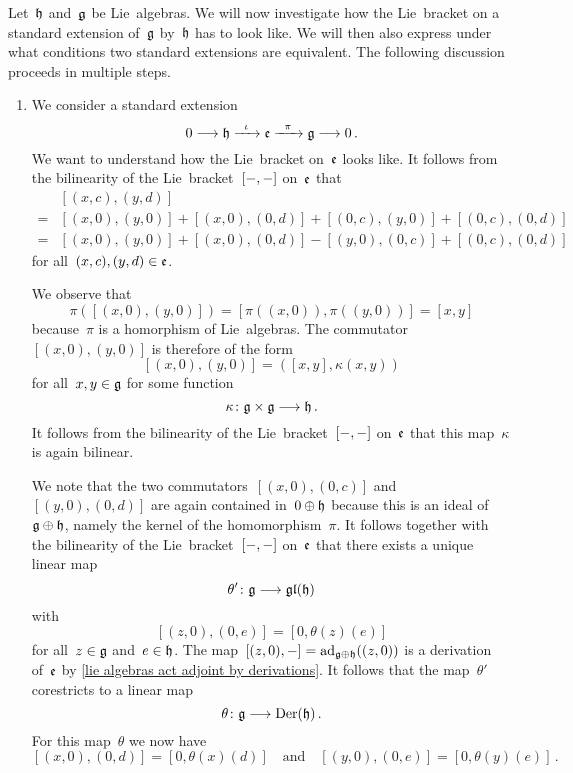 \begin{fluff}
	\label{general approach to extensions}
	Let~$\mathfrak{h}$ and~$\mathfrak{g}$ be Lie~algebras.
	We will now investigate how the Lie~bracket on a standard extension of~$\mathfrak{g}$ by~$\mathfrak{h}$ has to look like.
	We will then also express under what conditions two standard extensions are equivalent.
	The following discussion proceeds in multiple steps.
	\begin{enumerate}
		\item
			We consider a standard extension
			\[
				0
				\to
				\hlie
				\xto{\iota}
				\elie
				\xto{\pi}
				\glie
				\to
				0 \,.
			\]
			We want to understand how the Lie~bracket on~$\mathfrak{e}$ looks like.
			It follows from the bilinearity of the Lie~bracket~$[-, -]$ on~$\mathfrak{e}$ that
			\begin{align*}
				{}&
				[(x, c), (y,d)]
				\\
				={}&
					[(x,0), (y,0)]
				+ [(x,0), (0,d)]
				+ [(0,c), (y,0)]
				+ [(0,c), (0,d)]
				\\
				={}&
					[(x,0), (y,0)]
				+ [(x,0), (0,d)]
				- [(y,0), (0,c)]
				+ [(0,c), (0,d)]
			\end{align*}
			for all~$(x,c), (y,d) \in \mathfrak{e}$.

			We observe that
			\[
				\pi( [(x,0), (y,0)] )
				=
				[ \pi( (x,0) ), \pi( (y,0) ) ]
				=
				[x, y]
			\]
			because~$\pi$ is a homorphism of Lie~algebras.
			The commutator~$[(x,0), (y,0)]$ is therefore of the form
			\[
				[(x,0), (y,0)]
				=
				( [x,y], \kappa(x,y) )
			\]
			for all~$x, y \in \mathfrak{g}$ for some function
			\[
				\kappa
				\colon
				\glie \times \glie
				\to
				\hlie \,.
			\]
			It follows from the bilinearity of the Lie~bracket~$[-, -]$ on~$\mathfrak{e}$ that this map~$\kappa$ is again bilinear.

			We note that the two commutators~$[(x,0), (0,c)]$ and~$[(y,0), (0,d)]$ are again contained in~$0 \oplus \mathfrak{h}$ because this is an ideal of~$\mathfrak{g} \oplus \mathfrak{h}$, namely the kernel of the homomorphism~$\pi$.
			It follows together with the bilinearity of the Lie~bracket~$[-, -]$ on~$\mathfrak{e}$ that there exists a unique linear map
			\[
				\theta'
				\colon
				\glie
				\to
				\gllie(\hlie)
			\]
			with
			\[
				[(z,0), (0,e)]
				=
				[0, \theta(z)(e)]
			\]
			for all~$z \in \mathfrak{g}$ and~$e \in \mathfrak{h}$.
			The map~$[(z,0), -] = \operatorname{ad}_{\mathfrak{g} \oplus \mathfrak{h}}((z,0))$ is a derivation of~$\mathfrak{e}$ by \cref{lie algebras act adjoint by derivations}.
			It follows that the map~$\theta'$ corestricts to a linear map
			\[
				\theta
				\colon
				\glie
				\to
				\Der(\hlie) \,.
			\]
			For this map~$\theta$ we now have
			\[
				[(x,0), (0,d)]
				=
				[0, \theta(x)(d)]
				\quad\text{and}\quad
				[(y,0), (0,e)]
				=
				[0, \theta(y)(e)] \,.
			\]


\end{enumerate}
\end{fluff}
